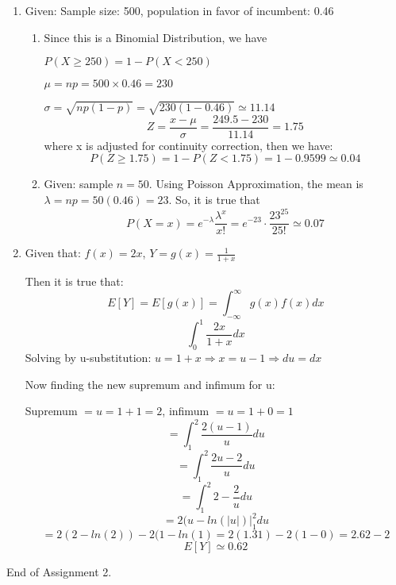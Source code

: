 \documentclass[12pt]{article}
\begin{document}
\begin{enumerate}
		\item Given: Sample size: 500, population in favor of incumbent: 0.46
			\begin{enumerate}
				\item Since this is a Binomial Distribution, we have

				$P(X \geq 250) = 1 - P(X < 250)$
				
				$\mu = np = 500 \times 0.46 = 230$
				
				$\sigma = \sqrt{np(1-p)} = \sqrt{230(1-0.46)} \simeq 11.14$
				$$Z = \frac{x - \mu}{\sigma} = \frac{249.5 - 230}{11.14} = 1.75$$
				where x is adjusted for continuity correction, then we have:
				$$P(Z \geq 1.75) = 1 - P(Z < 1.75) = 1 - 0.9599 \simeq 0.04$$
				
				\item Given: sample $n = 50$. Using Poisson Approximation, the mean is $\lambda = np = 50(0.46) = 23$. So, it is true that
				$$P(X = x) = e^{-\lambda} \frac{\lambda^x}{x!} = e^{-23} \cdot \frac{23^{25}}{25!} \simeq 0.07$$
			\end{enumerate}
			
		\item Given that: $f(x) = 2x$, $Y = g(x) = \frac{1}{1 + x}$
			
			Then it is true that:
			$$E[Y] = E[g(x)] = \int_{-\infty}^{\infty} g(x)f(x)dx$$
			$$\int_{0}^{1} \frac{2x}{1 + x}dx$$
			Solving by u-substitution: $u = 1 + x \Rightarrow x = u - 1 \Rightarrow du = dx$
			
			Now finding the new supremum and infimum for u:
			
			Supremum $= u = 1 + 1 = 2$, infimum $= u = 1 + 0 = 1$
			$$= \int_{1}^{2} \frac{2(u-1)}{u}du$$
			$$= \int_{1}^{2} \frac{2u-2}{u}du$$
			$$= \int_{1}^{2} 2 - \frac{2}{u}du$$
			$$= 2(u - ln(|u|)\vert_{1}^{2}du$$
			$$= 2(2 - ln(2)) - 2(1 - ln(1) = 2(1.31) - 2(1 - 0) = 2.62 - 2$$
			$$E[Y] \simeq 0.62$$
\end{enumerate}

End of Assignment 2.
\end{document}
